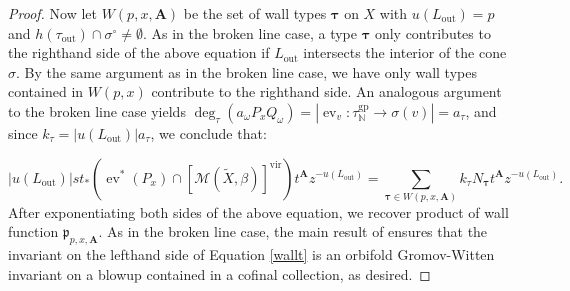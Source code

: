 \documentclass[12pt, oneside]{amsart}   	%
\newcommand{\NN}{\mathbb{N}}
\newcommand{\vir}{\operatorname{vir}}
\newcommand{\orb}{\operatorname{orb}}
\newcommand{\ev}{\operatorname{ev}}
\newcommand{\gp}{\operatorname{gp}}
\newcommand{\out}{\operatorname{out}}
\numberwithin{equation}{section}
\numberwithin{thm}{section}
\numberwithin{figure}{section}
\begin{document}
\begin{proof}
Now let $W(p,x,\textbf{A})$ be the set of wall types $\pmb\tau$ on $X$ with $u(L_{\out}) = p$ and $h(\tau_{\out})\cap\sigma^{\circ} \not= \emptyset$. As in the broken line case, a type $\pmb\tau$ only contributes to the righthand side of the above equation if $L_{\out}$ intersects the interior of the cone $\sigma$. By the same argument as in the broken line case, we have only wall types contained in $W(p,x)$ contribute to the righthand side. An analogous argument to the broken line case yields $\deg_{\tau}(a_{\omega}P_xQ_{\omega}) = |\ev_v: \tau^{\gp}_{\NN}\rightarrow \sigma(v)| = a_{\tau}$, and since $k_{\tau} = |u(L_{\out})|a_{\tau}$, we conclude that:
 
  \begin{equation}\label{wallt}
|u(L_{\out})| st_*(\ev^*(P_x)\cap[\mathscr{M}(\widetilde{X},\beta)]^{\vir})t^{\textbf{A}}z^{-u(L_{\out})} = \sum_{\pmb\tau \in W(p,x,\textbf{A})} k_{\tau}N_{\pmb\tau} t^{\textbf{A}}z^{-u(L_{\out})}.
 \end{equation}
After exponentiating both sides of the above equation, we recover product of wall function $\mathfrak{p}_{p,x,\textbf{A}}$. As in the broken line case, the main result of \cite{BNR2} ensures that the invariant on the lefthand side of Equation \ref{wallt} is an orbifold Gromov-Witten invariant on a blowup contained in a cofinal collection, as desired. 
\end{proof}

 
\end{document}
